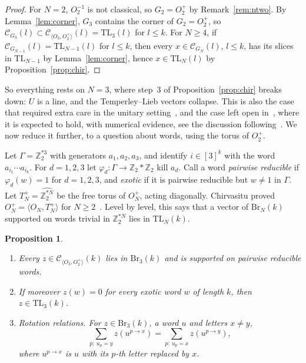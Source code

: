 \documentclass[11pt]{amsart}
\newtheorem{proposition}[theorem]{Proposition}
\theoremstyle{definition}
\theoremstyle{remark}
\theoremstyle{plain}
\numberwithin{equation}{section}
\numberwithin{table}{section}
\newcommand{\Z}{\mathbb Z}
\newcommand{\TL}{\mathrm{TL}}
\newcommand{\Br}{\mathrm{Br}}
\begin{document}
\begin{proof}
For $N=2$, $O_2^{-1}$ is not classical, so $G_2=O_2^+$ by Remark~\ref{rem:ntwo}. By Lemma~\ref{lem:corner}, $G_3$ contains
the corner of $G_2=O_2^+$, so $\mathcal C_{G_3}(l)\subset \mathcal C_{\langle O_3,O_2^+\rangle}(l)=\TL_3(l)$ for $l\le k$. For $N\ge4$, if
$\mathcal C_{G_{N-1}}(l)=\TL_{N-1}(l)$ for $l\le k$, then every $x\in \mathcal C_{G_N}(l)$, $l\le k$, has its slices in $\TL_{N-1}$ by
Lemma~\ref{lem:corner}, hence $x\in\TL_N(l)$ by Proposition~\ref{prop:chir}.
\end{proof}

So everything rests on $N=3$, where step~3 of Proposition~\ref{prop:chir} breaks down: $U$ is a line, and the
Temperley--Lieb vectors collapse. This is also the case that required extra care in the unitary setting~\cite{ch1,ch2},
and the case left open in~\cite{bcv}, where it is expected to hold, with numerical evidence, see the discussion
following~\cite[Thm.~4.1]{bcv}. We now reduce it further, to a question about words, using the torus of $O_2^+$.

Let $\Gamma=\Z_2^{*3}$ with generators $a_1,a_2,a_3$, and identify $i\in[3]^k$ with the word $a_{i_1}\cdots a_{i_k}$. For
$d=1,2,3$ let $\varphi_d:\Gamma\to\Z_2*\Z_2$ kill $a_d$. Call a word \emph{pairwise reducible} if $\varphi_d(w)=1$ for
$d=1,2,3$, and \emph{exotic} if it is pairwise reducible but $w\ne1$ in $\Gamma$. Let $T_N^+=\widehat{\Z_2^{*N}}$ be the free
torus of $O_N^+$, acting diagonally. Chirvasitu proved $O_N^+=\langle O_N,T_N^+\rangle$ for $N\ge2$~\cite[Theorem~3.3]{ch2}.
Level by level, this says that a vector of $\Br_N(k)$ supported on words trivial in $\Z_2^{*N}$ lies in $\TL_N(k)$.

\begin{proposition}\label{prop:torus}
\leavevmode
\begin{enumerate}
\item Every $z\in \mathcal C_{\langle O_3,O_2^+\rangle}(k)$ lies in $\Br_3(k)$ and is supported on pairwise reducible words.
\item If moreover $z(w)=0$ for every exotic word $w$ of length $k$, then $z\in\TL_3(k)$.
\item \emph{Rotation relations.} For $z\in\Br_3(k)$, a word $u$ and letters $x\ne y$,
\[
\sum_{p:\ u_p=y}z(u^{p\to x})=\sum_{p:\ u_p=x}z(u^{p\to y}),
\]
where $u^{p\to x}$ is $u$ with its $p$-th letter replaced by $x$.
\end{enumerate}
\end{proposition}
\end{document}
